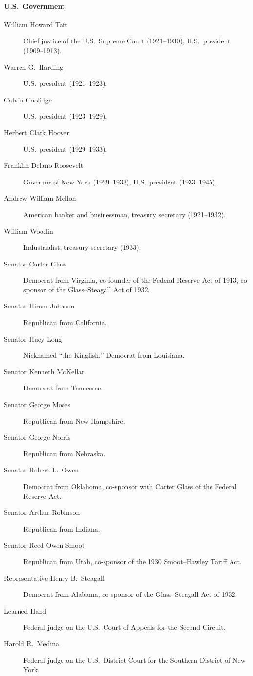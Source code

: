 \documentclass[11pt]{article}
\begin{document}
\paragraph{U.S.\ Government}
\begin{description}
\item[William Howard Taft] Chief justice of the U.S.\ Supreme Court
(1921--1930), U.S.\ president (1909--1913).
\item[Warren G.\ Harding] U.S.\ president (1921--1923).
\item[Calvin Coolidge] U.S.\ president (1923--1929).
\item[Herbert Clark Hoover] U.S.\ president (1929--1933).
\item[Franklin Delano Roosevelt] Governor of New York (1929--1933), U.S.\
president (1933--1945).
\item[Andrew William Mellon] American banker and businessman, treasury
secretary (1921--1932).
\item[William Woodin] Industrialist, treasury secretary (1933).
\item[Senator Carter Glass] Democrat from Virginia, co-founder of the Federal
Reserve Act of 1913, co-sponsor of the Glass--Steagall Act of 1932.
\item[Senator Hiram Johnson] Republican from California.
\item[Senator Huey Long] Nicknamed ``the Kingfish,'' Democrat from Louisiana.
\item[Senator Kenneth McKellar] Democrat from Tennessee.
\item[Senator George Moses] Republican from New Hampshire.
\item[Senator George Norris] Republican from Nebraska.
\item[Senator Robert L.\ Owen] Democrat from Oklahoma, co-sponsor with Carter
Glass of the Federal Reserve Act.
\item[Senator Arthur Robinson] Republican from Indiana.
\item[Senator Reed Owen Smoot] Republican from Utah, co-sponsor of the 1930
Smoot--Hawley Tariff Act.
\item[Representative Henry B.\ Steagall] Democrat from Alabama, co-sponsor of
the Glass--Steagall Act of 1932.
\item[Learned Hand] Federal judge on the U.S.\ Court of Appeals for the
Second Circuit.
\item[Harold R.\ Medina] Federal judge on the U.S.\ District Court for the
Southern District of New York.
\end{description}
\end{document}
